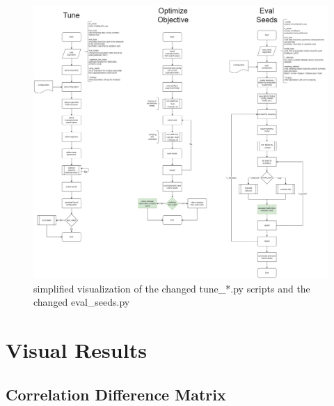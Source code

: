 \begin{landscape}
	\begin{figure}
		\centering
		\includegraphics[height=\textheight,width=\linewidth,keepaspectratio]{images/tune_eval_seeds-CHANGED.png}
		\caption{simplified visualization of the changed tune\_*.py scripts and the changed eval\_seeds.py}
	\end{figure}
\end{landscape}





\section{Visual Results}
\label{A:Visual_results}
\subsection[]{Correlation Difference Matrix}
\label{A:corr_matrix}

